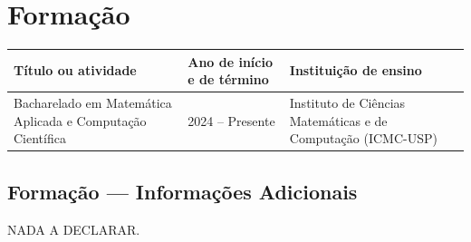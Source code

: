 \section{Formação}
\vspace*{-\baselineskip}
\begin{table}[H]
	\centering
	\begin{tabular}{p{5.7cm} l p{5.1cm}}
		\toprule[1.25pt]
		\textbf{Título ou atividade} & \textbf{Ano de início e de término} & \textbf{Instituição de ensino} \\
		\midrule[0.75pt]
		Bacharelado em Matemática Aplicada e Computação Científica
		& 2024 -- Presente
		& Instituto de Ciências Matemáticas e de Computação (ICMC-USP) \\
		\bottomrule[1.25pt]
	\end{tabular}
\end{table}

\subsection{Formação --- Informações Adicionais}
	NADA A DECLARAR.
